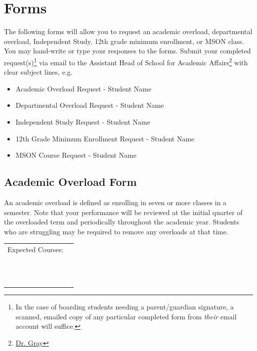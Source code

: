 \newpage
\section{Forms}

The following forms will allow you to request an academic overload, departmental overload, Independent Study, 12th grade minimum enrollment, or MSON class.  You may hand-write or type your responses to the forms.  Submit your completed request(s)\footnote{In the case of boarding students needing a parent/guardian signature, a scanned, emailed copy of any particular completed form from \emph{their} email account will suffice.} via email to the Assistant Head of School for Academic Affairs\footnote{\href{mailto:jonathan.gray@indiansprings.org}{Dr. Gray}} with clear subject lines, e.g. 

\begin{itemize}
  \item Academic Overload Request - Student Name
  \item Departmental Overload Request - Student Name  
  \item Independent Study Request - Student Name
  \item 12th Grade Minimum Enrollment Request  - Student Name
  \item MSON Course Request - Student Name
\end{itemize}

\newpage

\subsection{Academic Overload Form}

An academic overload is defined as enrolling in seven or more classes in a semester. Note that your performance will be reviewed at the initial quarter of the overloaded term and periodically throughout the academic year.  Students who are struggling may be required to remove any overloads at that time.  

\vspace{.5cm}


\begin{tabular}{ll}
Expected Courses: & \underline{\hspace{7cm}}\\
&\\
& \underline{\hspace{7cm}}\\
&\\
& \underline{\hspace{7cm}}\\
&\\
& \underline{\hspace{7cm}}\\
&\\
& \underline{\hspace{7cm}}\\
&\\
& \underline{\hspace{7cm}}\\
&\\
& \underline{\hspace{7cm}}
\end{tabular}



